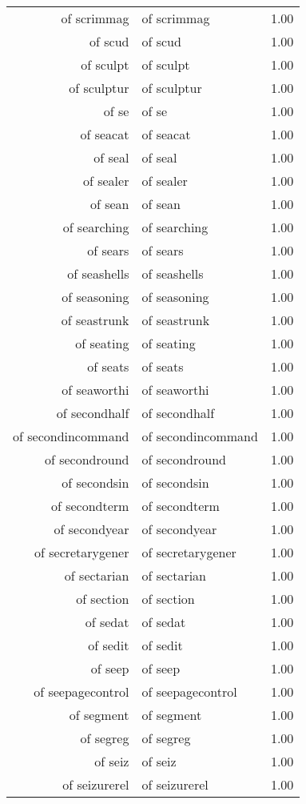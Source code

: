 \begin{table}[ht]
\begin{tabular}{rlr}
  of scrimmag & of scrimmag & 1.00 \\ 
  of scud & of scud & 1.00 \\ 
  of sculpt & of sculpt & 1.00 \\ 
  of sculptur & of sculptur & 1.00 \\ 
  of se & of se & 1.00 \\ 
  of seacat & of seacat & 1.00 \\ 
  of seal & of seal & 1.00 \\ 
  of sealer & of sealer & 1.00 \\ 
  of sean & of sean & 1.00 \\ 
  of searching & of searching & 1.00 \\ 
  of sears & of sears & 1.00 \\ 
  of seashells & of seashells & 1.00 \\ 
  of seasoning & of seasoning & 1.00 \\ 
  of seastrunk & of seastrunk & 1.00 \\ 
  of seating & of seating & 1.00 \\ 
  of seats & of seats & 1.00 \\ 
  of seaworthi & of seaworthi & 1.00 \\ 
  of secondhalf & of secondhalf & 1.00 \\ 
  of secondincommand & of secondincommand & 1.00 \\ 
  of secondround & of secondround & 1.00 \\ 
  of secondsin & of secondsin & 1.00 \\ 
  of secondterm & of secondterm & 1.00 \\ 
  of secondyear & of secondyear & 1.00 \\ 
  of secretarygener & of secretarygener & 1.00 \\ 
  of sectarian & of sectarian & 1.00 \\ 
  of section & of section & 1.00 \\ 
  of sedat & of sedat & 1.00 \\ 
  of sedit & of sedit & 1.00 \\ 
  of seep & of seep & 1.00 \\ 
  of seepagecontrol & of seepagecontrol & 1.00 \\ 
  of segment & of segment & 1.00 \\ 
  of segreg & of segreg & 1.00 \\ 
  of seiz & of seiz & 1.00 \\ 
  of seizurerel & of seizurerel & 1.00 \\ 

\end{tabular}
\end{table}
